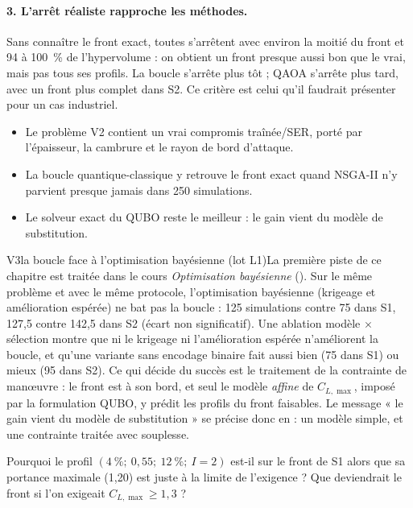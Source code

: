 \paragraph{3. L'arrêt réaliste rapproche les méthodes.} Sans connaître le front exact, toutes s'arrêtent avec environ la moitié du front et 94 à 100~\% de l'hypervolume : on obtient un front presque aussi bon que le vrai, mais pas tous ses profils. La boucle s'arrête plus tôt ; QAOA s'arrête plus tard, avec un front plus complet dans S2. Ce critère est celui qu'il faudrait présenter pour un cas industriel.

\begin{resultat}
\begin{itemize}
\item Le problème V2 contient un vrai compromis traînée/SER, porté par l'épaisseur, la cambrure et le rayon de bord d'attaque.
\item La boucle quantique-classique y retrouve le front exact quand NSGA-II n'y parvient presque jamais dans 250 simulations.
\item Le solveur exact du QUBO reste le meilleur : le gain vient du modèle de substitution.
\end{itemize}
\end{resultat}

\begin{evolution}{V3}{la boucle face à l'optimisation bayésienne (lot L1)}La première piste de ce chapitre est traitée dans le cours \emph{Optimisation bayésienne} (). Sur le même problème et avec le même protocole, l'optimisation bayésienne (krigeage et amélioration espérée) ne bat pas la boucle : 125 simulations contre 75 dans S1, 127,5 contre 142,5 dans S2 (écart non significatif). Une ablation modèle $\times$ sélection montre que ni le krigeage ni l'amélioration espérée n'améliorent la boucle, et qu'une variante sans encodage binaire fait aussi bien (75 dans S1) ou mieux (95 dans S2). Ce qui décide du succès est le traitement de la contrainte de manœuvre : le front est à son bord, et seul le modèle \emph{affine} de $C_{L,\max}$, imposé par la formulation QUBO, y prédit les profils du front faisables. Le message « le gain vient du modèle de substitution » se précise donc en : un modèle simple, et une contrainte traitée avec souplesse.\end{evolution}

\exercices
\begin{exercice}
Pourquoi le profil $(4~\%;\ 0{,}55;\ 12~\%;\ I=2)$ est-il sur le front de S1 alors que sa portance maximale (1,20) est juste à la limite de l'exigence ? Que deviendrait le front si l'on exigeait $C_{L,\max}\ge1{,}3$ ?
\end{exercice}

